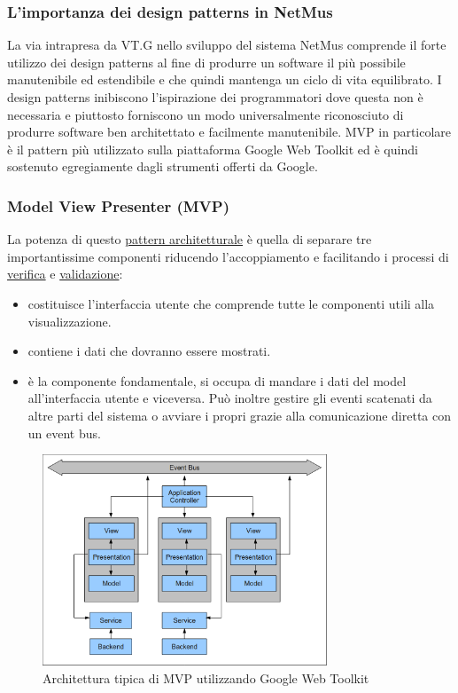 \subsubsection{L'importanza dei design patterns in NetMus}
La via intrapresa da VT.G nello sviluppo del sistema NetMus comprende il forte
utilizzo dei design patterns al fine di produrre un software il pi\`u
possibile manutenibile ed estendibile e che quindi mantenga un ciclo di
vita equilibrato. 
I design patterns inibiscono l'ispirazione dei programmatori dove
questa non \`e necessaria e piuttosto forniscono un modo universalmente
riconosciuto di produrre software ben architettato e facilmente manutenibile.
MVP in particolare \`e il pattern pi\`u utilizzato sulla piattaforma Google Web
Toolkit ed \`e quindi sostenuto egregiamente dagli strumenti offerti da
Google.

\newpage
\subsubsection{Model View Presenter (MVP) }
La potenza di questo \underline{pattern architetturale} \`e quella di separare
tre importantissime componenti riducendo l'accoppiamento e facilitando i processi di
\underline{verifica} e \underline{validazione}:
\begin{itemize}
  \item{ }
  costituisce l'interfaccia utente che comprende tutte le componenti utili alla
  visualizzazione.
  \item{ }
  contiene i dati che dovranno essere mostrati. 
  \item{ }
  \`e la componente fondamentale, si occupa di mandare i dati del model
  all'interfaccia utente e viceversa. Pu\`o inoltre gestire gli eventi scatenati
  da altre parti del sistema o avviare i propri grazie alla comunicazione diretta
  con un event bus.

\end{itemize}    
\begin{figure}[!h]
\centering
\includegraphics[width=8.5cm]{img/ST/mvp.png}
\caption{Architettura tipica di MVP utilizzando Google Web Toolkit}
\end{figure}

